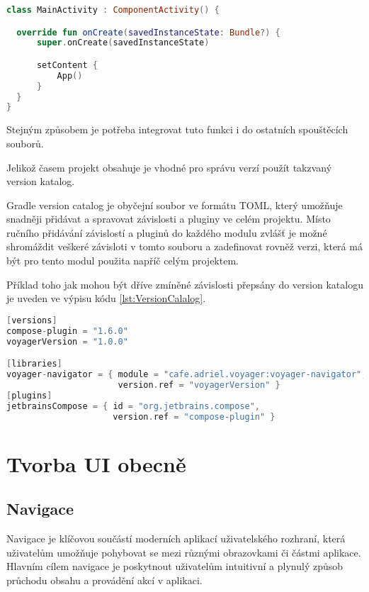 \begin{lstlisting}[caption={Lib integration}, label={lst:SharedIntegration}, language=Kotlin]
class MainActivity : ComponentActivity() {

  override fun onCreate(savedInstanceState: Bundle?) {
      super.onCreate(savedInstanceState)

      setContent {
          App()
      }
  }
}
\end{lstlisting}

Stejným způsobem je potřeba integrovat tuto funkci i do ostatních spouštěcích souborů. 



Jelikož časem projekt obsahuje je vhodné pro správu verzí použít takzvaný version katalog. 

Gradle version catalog je obyčejní soubor ve formátu TOML, který umožňuje snadněji přidávat a spravovat závislosti a pluginy ve celém projektu. 
Místo ručního přidávání závislostí a pluginů do každého modulu zvlášť je možné shromáždit veškeré závisloti v tomto souboru a zadefinovat rovněž
verzi, která má být pro tento modul použita napříč celým projektem. 

Příklad toho jak mohou být dříve zmíněné závislosti přepsány do version
katalogu je uveden ve výpisu kódu \ref{lst:VersionCalalog}.

\begin{lstlisting}[caption={Version katalog}, label={lst:VersionCalalog}, language=Kotlin]
[versions]
compose-plugin = "1.6.0"
voyagerVersion = "1.0.0"

[libraries]
voyager-navigator = { module = "cafe.adriel.voyager:voyager-navigator", 
                      version.ref = "voyagerVersion" }
[plugins]
jetbrainsCompose = { id = "org.jetbrains.compose",
                     version.ref = "compose-plugin" }

\end{lstlisting}

\section{Tvorba UI obecně}
\subsection{Navigace}
Navigace je klíčovou součástí moderních aplikací uživatelského rozhraní, která uživatelům umožňuje pohybovat se mezi různými obrazovkami či 
částmi aplikace. Hlavním cílem navigace je poskytnout uživatelům intuitivní a plynulý způsob průchodu obsahu a provádění akcí v aplikaci. 

